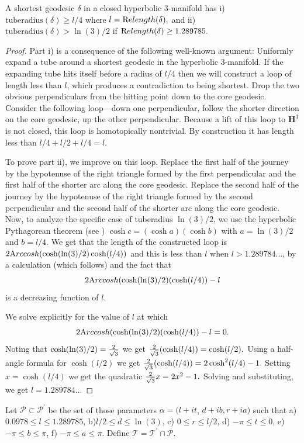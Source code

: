 \begin{proposition}\label{GMT prop1.11} A {\textrm shortest}  geodesic $\delta$ in a closed hyperbolic $3$\/{\textrm -}\/manifold has 
{\textrm i)}  $\mathrm {tuberadius}(\delta) \ge l/4$ where $l = {\textrm Relength}(\delta),$  and
{\textrm ii)} $\mathrm {tuberadius}(\delta) > \ln(3)/2$ if 
${\textrm Relength}(\delta) \ge 1.289785.$ 
\end{proposition}

\begin{proof} Part i) is a consequence of the following 
well-known argument:
Uniformly expand a tube around a shortest geodesic in the hyperbolic
$3$-manifold. 
If the expanding tube hits itself before a
radius of $l/4$ then we will construct a loop of length less than $l$, which produces a
contradiction to being shortest.  Drop the two obvious perpendiculars from
the hitting point down to the core geodesic. 
Consider the following loop---down one perpendicular, 
follow the shorter direction on the core geodesic,
up the other perpendicular. Because a lift of this loop
to $\mathbf {H}^3$ is not closed, this loop is homotopically nontrivial.  By
construction it has length less than $l/4 + l/2 + l/4 = l.$  

To prove part ii), we improve on this loop.  
Replace the first half of the journey by the
hypotenuse of the right triangle formed by the first perpendicular and the
first half of the shorter arc along the core geodesic.  Replace the second
half of the journey by the hypotenuse of the right triangle formed by the
second perpendicular and the second half of the shorter arc along the core
geodesic.  
Now, to analyze the specific case of tuberadius $\ln(3)/2$, we use
the hyperbolic Pythagorean theorem (see \cite{F}) 
$\cosh c = (\cosh a)
( \cosh b)$ with $a = \ln(3)/2$ and $b = l/4.$ 
We get that the length of the
constructed loop is $2 {\textrm Arccosh} (\cosh(\ln(3)/2) \cosh (l/4))$ and this is
less than $l$ when $l > 1.289784\ldots$, 
by a calculation (which follows) and the fact that $$2 {\textrm Arccosh} (\cosh(\ln(3)/2) (\cosh (l/4)) - l$$ is a decreasing function of $l$.

We solve explicitly for the value of $l$ at which
$$2 {\textrm Arccosh} (\cosh(\ln(3)/2) (\cosh (l/4)) - l = 0.$$  Noting that
$\cosh(\ln(3)/2) = {2 \over \sqrt 3}$ we get ${2 \over \sqrt 3}(\cosh (l/4)) 
= \cosh(l/2).$  Using a half-angle formula for $\cosh(l/2)$ we get ${2
\over \sqrt 3}(\cosh (l/4))  = 2\cosh^2(l/4) - 1.$  Setting $x =
\cosh(l/4)$ we get the quadratic ${2 \over \sqrt 3} x = 2 x^2 -1.$
Solving and substituting, we get $l = 1.289784\ldots$ \end{proof}
\begin{definition}\label{GMT 1.12}
Let $\mathcal {P}\subset\mathcal {P}^{\prime}$ be the set of those parameters $\alpha
= (l+it$, $d+ib, r+ia)$ such
that
 a)       $0.0978\le l \le 1.289785$,
 b)\enspace      $l/2 \le d\le \ln(3)$,
 c) \enspace   $0\le r \le l/2$,
 d) \enspace      $-\pi \le t \le 0$,
 e) \enspace	$-\pi \le b \le \pi$,
 f) \enspace	$-\pi \le a \le \pi$.
\noindent 
Define $\mathcal {T}=\mathcal {T}^{\prime}\cap \mathcal {P}.$
\end{definition}

